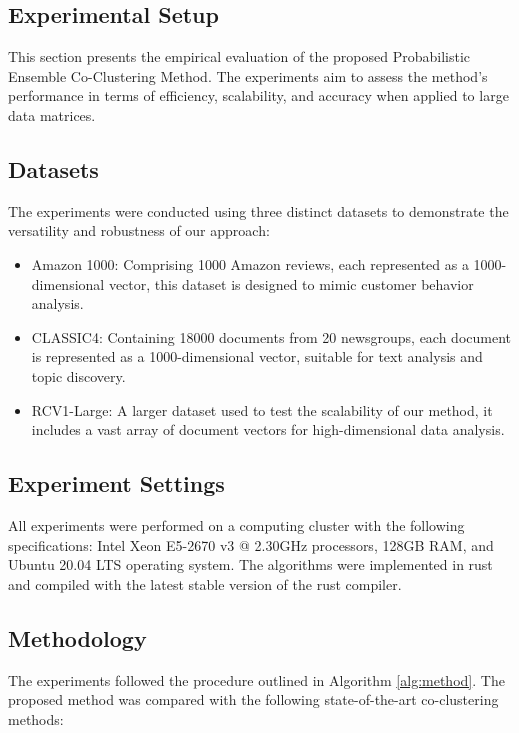 \subsection{Experimental Setup}

This section presents the empirical evaluation of the proposed Probabilistic Ensemble Co-Clustering Method. The experiments aim to assess the method's performance in terms of efficiency, scalability, and accuracy when applied to large data matrices.

\subsection{Datasets}

The experiments were conducted using three distinct datasets to demonstrate the versatility and robustness of our approach:

\begin{itemize}
    \item Amazon 1000: Comprising 1000 Amazon reviews, each represented as a 1000-dimensional vector, this dataset is designed to mimic customer behavior analysis.
    \item CLASSIC4: Containing 18000 documents from 20 newsgroups, each document is represented as a 1000-dimensional vector, suitable for text analysis and topic discovery.
    \item RCV1-Large: A larger dataset used to test the scalability of our method, it includes a vast array of document vectors for high-dimensional data analysis.
\end{itemize}

\subsection{Experiment Settings}
All experiments were performed on a computing cluster with the following specifications: Intel Xeon E5-2670 v3 @ 2.30GHz processors, 128GB RAM, and Ubuntu 20.04 LTS operating system. The algorithms were implemented in rust and compiled with the latest stable version of the rust compiler. 

\subsection{Methodology}
The experiments followed the procedure outlined in Algorithm \ref{alg:method}. The proposed method was compared with the following state-of-the-art co-clustering methods:

